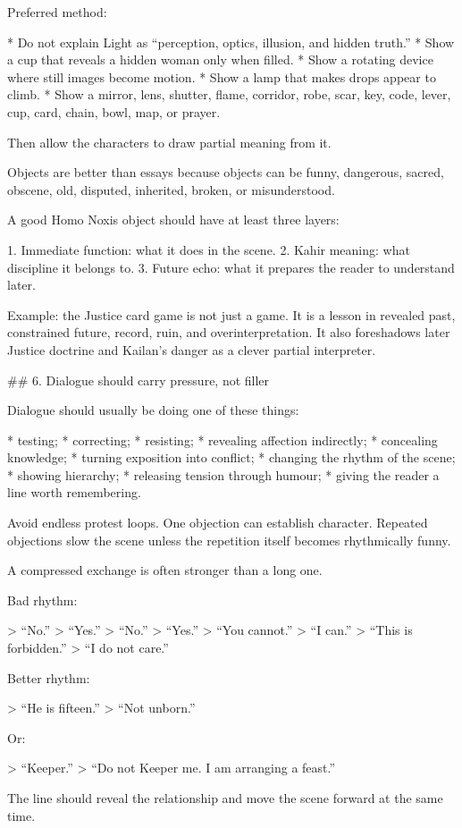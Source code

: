 Preferred method:

* Do not explain Light as “perception, optics, illusion, and hidden truth.”
* Show a cup that reveals a hidden woman only when filled.
* Show a rotating device where still images become motion.
* Show a lamp that makes drops appear to climb.
* Show a mirror, lens, shutter, flame, corridor, robe, scar, key, code, lever, cup, card, chain, bowl, map, or prayer.

Then allow the characters to draw partial meaning from it.

Objects are better than essays because objects can be funny, dangerous, sacred, obscene, old, disputed, inherited, broken, or misunderstood.

A good Homo Noxis object should have at least three layers:

1. Immediate function: what it does in the scene.
2. Kahir meaning: what discipline it belongs to.
3. Future echo: what it prepares the reader to understand later.

Example: the Justice card game is not just a game. It is a lesson in revealed past, constrained future, record, ruin, and overinterpretation. It also foreshadows later Justice doctrine and Kailan’s danger as a clever partial interpreter.

## 6. Dialogue should carry pressure, not filler

Dialogue should usually be doing one of these things:

* testing;
* correcting;
* resisting;
* revealing affection indirectly;
* concealing knowledge;
* turning exposition into conflict;
* changing the rhythm of the scene;
* showing hierarchy;
* releasing tension through humour;
* giving the reader a line worth remembering.

Avoid endless protest loops. One objection can establish character. Repeated objections slow the scene unless the repetition itself becomes rhythmically funny.

A compressed exchange is often stronger than a long one.

Bad rhythm:

> “No.”
> “Yes.”
> “No.”
> “Yes.”
> “You cannot.”
> “I can.”
> “This is forbidden.”
> “I do not care.”

Better rhythm:

> “He is fifteen.”
> “Not unborn.”

Or:

> “Keeper.”
> “Do not Keeper me. I am arranging a feast.”

The line should reveal the relationship and move the scene forward at the same time.

